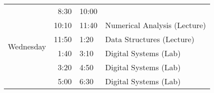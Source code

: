 \documentclass{article}
\begin{document}
\begin{table}[!htbp]
\begin{tabular}{|c|r l|l|}
\midrule
\multirow{6}{*}{Wednesday}  &  8:30 & 10:00 & \\
                            & 10:10 & 11:40 & Numerical Analysis (Lecture)\\
                            & 11:50 &  1:20 & Data Structures (Lecture)\\
                            &  1:40 &  3:10 & Digital Systems (Lab)\\
                            &  3:20 &  4:50 & Digital Systems (Lab)\\
                            &  5:00 &  6:30 & Digital Systems (Lab)\\


\bottomrule
\end{tabular}
\end{table}
\end{document}
